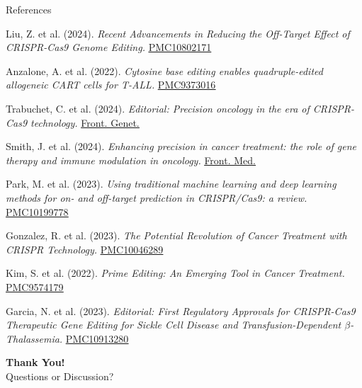 \documentclass[10pt]{beamer}
\let\oldhref\href
\renewcommand{\href}[2]{\oldhref{#1}{\uline{#2}}}
\begin{document}
\begin{frame}[allowframebreaks]{References}
\begin{thebibliography}{99}
    Liu, Z. et al. (2024).
    \emph{Recent Advancements in Reducing the Off-Target Effect of CRISPR-Cas9 Genome Editing.} \href{https://www.ncbi.nlm.nih.gov/pmc/articles/PMC10802171/}{PMC10802171}


    Anzalone, A. et al. (2022).
    \emph{Cytosine base editing enables quadruple-edited allogeneic CART cells for T-ALL.} \href{https://www.ncbi.nlm.nih.gov/pmc/articles/PMC9373016/}{PMC9373016}


    Trabuchet, C. et al. (2024).
    \emph{Editorial: Precision oncology in the era of CRISPR-Cas9 technology.} \href{https://www.frontiersin.org/articles/10.3389/fgene.2024.1506627}{Front. Genet.}


    Smith, J. et al. (2024).
    \emph{Enhancing precision in cancer treatment: the role of gene therapy and immune modulation in oncology.} \href{https://www.frontiersin.org/articles/10.3389/fmed.2024.1527600}{Front. Med.}


    Park, M. et al. (2023).
    \emph{Using traditional machine learning and deep learning methods for on- and off-target prediction in CRISPR/Cas9: a review.} \href{https://www.ncbi.nlm.nih.gov/pmc/articles/PMC10199778/}{PMC10199778}


    Gonzalez, R. et al. (2023).
    \emph{The Potential Revolution of Cancer Treatment with CRISPR Technology.} \href{https://www.ncbi.nlm.nih.gov/pmc/articles/PMC10046289/}{PMC10046289}


    Kim, S. et al. (2022).
    \emph{Prime Editing: An Emerging Tool in Cancer Treatment.} \href{https://www.ncbi.nlm.nih.gov/pmc/articles/PMC9574179/}{PMC9574179}


    Garcia, N. et al. (2023).
    \emph{Editorial: First Regulatory Approvals for CRISPR-Cas9 Therapeutic Gene Editing for Sickle Cell Disease and Transfusion-Dependent $\beta$-Thalassemia.} \href{https://www.ncbi.nlm.nih.gov/pmc/articles/PMC10913280/}{PMC10913280}

  \end{thebibliography}
\end{frame}


\begin{frame}
  \centering
  \Large \textbf{Thank You!}\\
  \vspace{0.3cm}
  \normalsize
  Questions or Discussion?
\end{frame}
\end{document}

